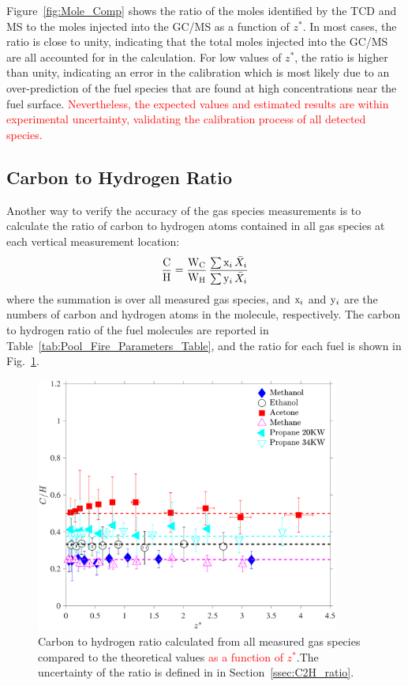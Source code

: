 \documentclass[12pt]{article}
\begin{document}
Figure~\ref{fig:Mole_Comp} shows the ratio of the moles identified by the TCD and MS to the moles injected into the GC/MS as a function of $z^*$. In most cases, the ratio is close to unity, indicating that the total moles injected into the GC/MS are all accounted for in the calculation. For low values of $z^*$, the ratio is higher than unity, indicating an error in the calibration which is most likely due to an over-prediction of the fuel species that are found at high concentrations near the fuel surface. \textcolor{red}{Nevertheless, the expected values and estimated results are within experimental uncertainty, validating the calibration process of all detected species.}

\subsection{Carbon to Hydrogen Ratio}

Another way to verify the accuracy of the gas species measurements is to calculate the ratio of carbon to hydrogen atoms contained in all gas species at each vertical measurement location:
\begin{equation}\label{eq:c2h_ratio}
  \frac{\rm C}{\rm H}= \frac{\textrm{W}_{\rm{C}}}{\textrm{W}_{\rm{H}}}\, \frac{ \sum  {\rm x}_i \, \bar{X}_{i}}{\sum {\rm y}_i \, \bar{X}_{i}}
\end{equation}
where the summation is over all measured gas species, and ${\rm x}_i$ and ${\rm y}_i$ are the numbers of carbon and hydrogen atoms in the molecule, respectively. The carbon to hydrogen ratio of the fuel molecules are reported in Table~\ref{tab:Pool_Fire_Parameters_Table}, and the ratio for each fuel is shown in Fig.~\ref{fig:C2H}.

\begin{figure}[h!]
	\centering
\includegraphics[width=10.0cm, keepaspectratio]{C2H_ratio_Comparison.pdf}
	\caption[Carbon to hydrogen ratio calculated from all species]{Carbon to hydrogen ratio calculated from all measured gas species compared to the theoretical values \textcolor{red}{ as a function of $z^*$}.The uncertainty of the ratio is defined in in Section~\ref{ssec:C2H_ratio}.}
	\label{fig:C2H}
\end{figure}
\end{document}
